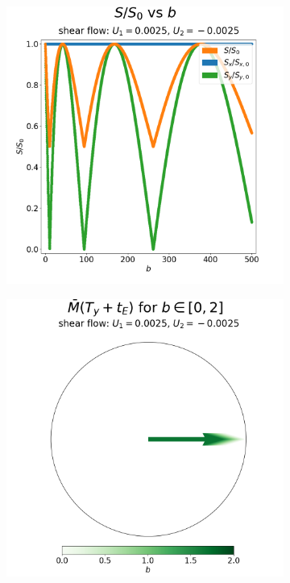 \begin{figure}
\begin{subfigure}{0.4\textwidth}
                        \includegraphics[width=\textwidth]{diagrams/results-mri/simple-tests/mri-spins_sall-vs-b_2D_shear_test_2.png}
                        \caption{}
                        \label{fig:mri-shear-2:s-vs-b}
                    \end{subfigure}
                    \begin{subfigure}{0.4\textwidth}
                        \centering
                        \includegraphics[width=\textwidth]{diagrams/results-mri/simple-tests/mri-spins_b_2D_shear_test_2.png}

\end{subfigure}
\end{figure}
